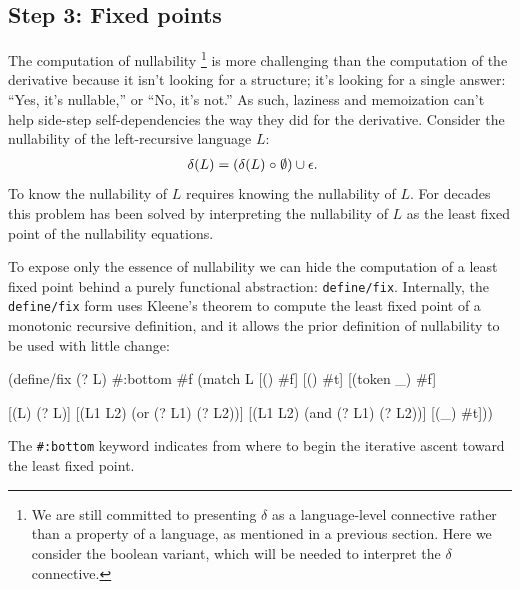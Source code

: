 \subsection{Step 3: Fixed points}
%
The computation of nullability%
\footnote{%
  We are still committed to presenting $\delta$ as a language-level connective
  rather than a property of a language, as mentioned in a previous section.
  Here we consider the boolean variant, which will be needed to interpret the
  $\delta$ connective.
}
is more challenging than
the computation of the derivative because it isn't looking for a structure;
it's looking for a single answer: ``Yes, it's nullable,'' or ``No, it's not.''
%
As such, laziness and memoization can't help side-step self-dependencies 
the way they did for the derivative.
%
Consider the nullability of the left-recursive language $L$:
\begin{align*}
  \delta(L) &=  (\delta(L) \mathrel{\circ} \emptyset)
    \cup \epsilon
  \text.
\end{align*}
%
To know the nullability of $L$ requires knowing the nullability of $L$.
%
For decades this problem has been solved by interpreting the nullability of $L$
as the least fixed point of the nullability equations.

To expose only the essence of nullability we can hide the computation of a
least fixed point behind a purely functional abstraction: {\tt define/fix}.
%
Internally, the {\tt define/fix} form uses Kleene's theorem 
to compute the least fixed point of a monotonic recursive 
definition, and it allows the prior definition of nullability
to be used with little change:

\begin{code}
(define/fix (\ttdelta? L)
  #:bottom #f
  (match L 
    [(\ttempty)         #f]
    [(\ttepsilon)         #t]    
    [(token _)   #f]

    [(\ttdelta L)       (\ttdelta? L)]
    [(\ttcup L1 L2)   (or  (\ttdelta? L1) (\ttdelta? L2))]
    [(\ttcirc L1 L2)   (and (\ttdelta? L1) (\ttdelta? L2))]
    [(\ttstar _)       #t])) \end{code}
%
The \texttt{\#:bottom} keyword indicates from where to begin the iterative
ascent toward the least fixed point.
%



